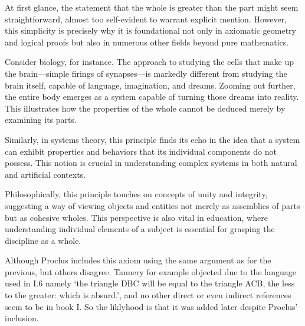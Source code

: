 At first glance, the statement that the whole is greater than the part might seem straightforward, almost too self-evident to warrant explicit mention. However, this simplicity is precisely why it is foundational not only in axiomatic geometry and logical proofs but also in numerous other fields beyond pure mathematics.

Consider biology, for instance. The approach to studying the cells that make up the brain—simple firings of synapses—is markedly different from studying the brain itself, capable of language, imagination, and dreams. Zooming out further, the entire body emerges as a system capable of turning those dreams into reality. This illustrates how the properties of the whole cannot be deduced merely by examining its parts.

Similarly, in systems theory, this principle finds its echo in the idea that a system can exhibit properties and behaviors that its individual components do not possess. This notion is crucial in understanding complex systems in both natural and artificial contexts.

Philosophically, this principle touches on concepts of unity and integrity, suggesting a way of viewing objects and entities not merely as assemblies of parts but as cohesive wholes. This perspective is also vital in education, where understanding individual elements of a subject is essential for grasping the discipline as a whole.

Although Proclus includes this axiom using the same argument as for the previous, but others disagree.  Tannery for example objected due to the language used in I.6 namely `the triangle DBC will be equal to the triangle ACB, the less to the greater: which is absurd.', and no other direct or even indirect references seem to be in book I. So the liklyhood is that  it was added later despite Proclus' inclusion.

\clearpage